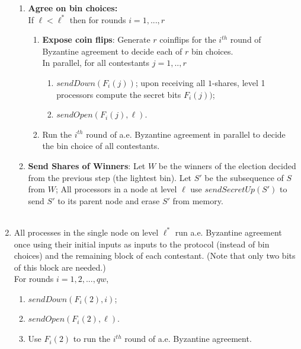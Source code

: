 \documentclass{sig-alternate}
\begin{document}
\begin{algorithm}
\begin{enumerate}
\begin{enumerate}
\item {\bf Agree on bin choices:}\\
If $\ell <\ell^*$ then for rounds  $i=1,...,r$ \\
\begin{enumerate}
\item
{\bf Expose coin flips}: Generate $r$ coinflips for the $i^{th}$ round of Byzantine agreement to decide each of $r$ bin choices.\\
In parallel,  for all contestants $j=1,..,r$ 
\begin{enumerate}
\item
$sendDown(F_i(j))$; upon receiving all $1$-shares, level 1 processors compute the secret bits $F_i(j))$;
\item
 $sendOpen(F_i(j), \ell)$.
\end{enumerate}
\item
Run the $i^{th}$ round of a.e. Byzantine agreement in parallel to decide the bin choice of all contestants. \\
\end{enumerate}

\item {\bf Send Shares of Winners}: 
Let $W$ be the winners of the election decided from the previous step (the lightest bin).  Let $S'$ be the subsequence of $S$ from $W$;   All processors in a node at level $\ell$ use $sendSecretUp(S')$ to  send $S'$ to its parent node
and erase $S'$ from memory. \\
   \\
\end{enumerate}
\item
All  processes in the single node on level $\ell^*$ run a.e. Byzantine agreement once using their initial inputs  as inputs to the protocol  (instead of bin choices) and the remaining block of each contestant. (Note that only two bits of  this block are needed.) \\
For rounds $i = 1, 2,..., qw$, 

 \begin{enumerate}
\item
 $sendDown(F_i(2),i)$;

 \item
 $sendOpen(F_i(2), \ell)$. 
\item
Use $F_i(2)$ to run the $i^{th}$ round of a.e. Byzantine agreement. 
\end{enumerate}


\end{enumerate}
\end{algorithm}
\end{document}
